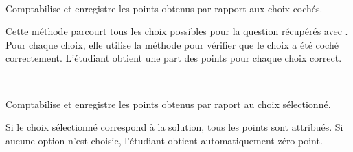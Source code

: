 \documentclass[a4,10pt,french]{sphinxmanual}
\begin{document}
\begin{fulllineitems}
\label{source:quiz.models.QcmSubmitMulti}~

\begin{fulllineitems}
\label{source:quiz.models.QcmSubmitMulti.save_result}
Comptabilise et enregistre les points obtenus par rapport aux choix cochés.

Cette méthode parcourt tous les choix possibles pour la question
 récupérés avec . Pour chaque
choix, elle utilise la méthode {\hyperref[source:quiz.models.QcmChoice.correct_submit]{\emph{}}} pour
vérifier que le choix a été coché correctement. L'étudiant obtient une part
des points pour chaque choix correct.

\end{fulllineitems}


\end{fulllineitems}


\begin{fulllineitems}
\label{source:quiz.models.QcmSubmitOne}~

\begin{fulllineitems}
\label{source:quiz.models.QcmSubmitOne.save_result}
Comptabilise et enregistre les points obtenus par raport au choix sélectionné.

Si le choix sélectionné correspond à la solution, tous les points sont attribués.
Si aucune option n'est choisie, l'étudiant obtient automatiquement zéro point.

\end{fulllineitems}


\end{fulllineitems}

\end{document}
